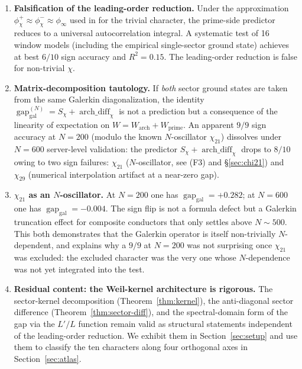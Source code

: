 \documentclass[10pt,twocolumn]{article}
\theoremstyle{definition}
\theoremstyle{remark}
\newcommand{\gap}{\operatorname{gap}}
\newcommand{\chifn}{\chi}
\newcommand{\archdiff}{\operatorname{arch\_diff}}
\begin{document}
\begin{enumerate}
\item[(F1)] \textbf{Falsification of the leading-order reduction.}
  Under the approximation
  $\phi^+_{\chifn}\approx\phi^-_{\chifn}\approx\phi_\infty$ used in
  \cite{RH_II} for the trivial character, the prime-side predictor
  reduces to a universal autocorrelation integral. A systematic test
  of 16 window models (including the empirical single-sector ground
  state) achieves at best $6/10$ sign accuracy and $R^2=0.15$.
  The leading-order reduction is false for non-trivial $\chi$.
\item[(F2)] \textbf{Matrix-decomposition tautology.}
  If \emph{both} sector ground states are taken from the same
  Galerkin diagonalization, the identity
  $\gap_{\mathrm{gal}}^{(N)} = S_{\chifn}+\archdiff_{\chifn}$
  is not a prediction but a consequence of the linearity of
  expectation on $W=W_{\mathrm{arch}}+W_{\mathrm{prime}}$. An apparent
  $9/9$ sign accuracy at $N=200$ (modulo the known $N$-oscillator
  $\chi_{21}$) dissolves under $N=600$ server-level validation: the
  predictor $S_{\chifn}+\archdiff_{\chifn}$ drops to $8/10$ owing
  to two sign failures: $\chi_{21}$ ($N$-oscillator,
  see (F3) and \S\ref{sec:chi21}) and $\chi_{29}$ (numerical
  interpolation artifact at a near-zero gap).
\item[(F3)] \textbf{$\chi_{21}$ as an $N$-oscillator.}
  At $N=200$ one has $\gap_{\mathrm{gal}}=+0.282$; at $N=600$ one has
  $\gap_{\mathrm{gal}}=-0.004$. The sign flip is not a formula defect
  but a Galerkin truncation effect for composite conductors that only
  settles above $N\sim 500$. This both demonstrates that the Galerkin
  operator is itself non-trivially $N$-dependent, and explains why a
  $9/9$ at $N=200$ was not surprising once $\chi_{21}$ was excluded:
  the excluded character was the very one whose $N$-dependence was not
  yet integrated into the test.
\item[(F4)] \textbf{Residual content: the Weil-kernel architecture is
  rigorous.} The sector-kernel decomposition
  (Theorem~\ref{thm:kernel}), the anti-diagonal sector difference
  (Theorem~\ref{thm:sector-diff}), and the spectral-domain form of the
  gap via the $L'/L$ function remain valid as structural statements
  independent of the leading-order reduction. We exhibit them in
  Section~\ref{sec:setup} and use them to classify the ten characters
  along four orthogonal axes in Section~\ref{sec:atlas}.
\end{enumerate}
\end{document}
